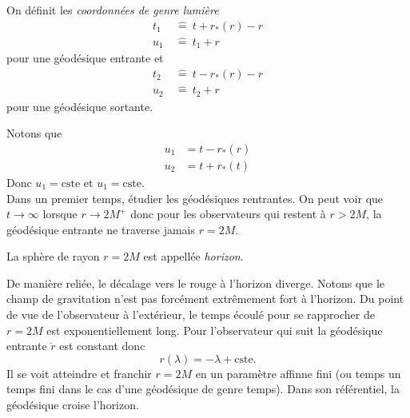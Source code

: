 \documentclass[a4paper,11pt]{report}
\begin{document}
            \begin{defn}
                On définit les \textit{coordonnées de genre lumière}
                \begin{align}
                    t_1 ~&\hat{=}~ t+r_*(r)-r\\
                    u_1 ~&\hat{=}~ t_1+r
                \end{align}
                pour une géodésique entrante et
                \begin{align}
                    t_2 ~&\hat{=}~ t-r_*(r)-r\\
                    u_2 ~&\hat{=}~ t_2+r
                \end{align}
                pour une géodésique sortante.
            \end{defn}
            Notons que 
            \begin{align}
                u_1 &= t-r_*(r)\\
                u_2 &= t+r_*(t)
            \end{align}
            Donc $u_1=\text{cste}$ et $u_1=\text{cste}$.\\
            

            
            Dans un premier temps, étudier les géodésiques rentrantes. On peut voir que $t\to\infty$ lorsque $r\to 2M^+$ donc pour les observateurs qui restent à $r> 2M$, la géodésique entrante ne traverse jamais $r=2M$.
            
            \begin{defn}
                La sphère de rayon $r=2M$ est appellée \textit{horizon}.
            \end{defn}
            
            
            De manière reliée, le décalage vers le rouge à l'horizon diverge. Notons que le champ de gravitation n'est pas forcément extrêmement fort à l'horizon. Du point de vue de l'observateur à l'extérieur, le temps écoulé pour se rapprocher de $r=2M$ est exponentiellement long. Pour l'observateur qui suit la géodésique entrante $\dot{r}$ est constant donc
            \begin{equation}
                r(\lambda) = -\lambda+\text{cste}.
            \end{equation}
            Il se voit atteindre et franchir $r=2M$ en un paramètre affinne fini (ou temps un temps fini dans le cas d'une géodésique de genre temps). Dans son référentiel, la géodésique croise l'horizon.\\
            
\end{document}
